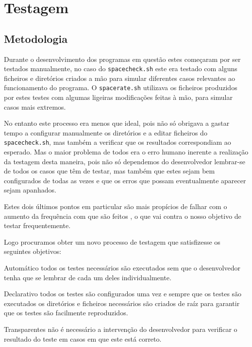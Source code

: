 \chapter{Testagem}

\section{Metodologia}\label{sec:testing_metodology}

Durante o desenvolvimento dos programas em questão estes começaram por ser
testados manualmente, no caso do \Verb|spacecheck.sh| este era testado com alguns
ficheiros e diretórios criados a mão para simular diferentes casos relevantes ao
funcionamento do programa. O \Verb|spacerate.sh| utilizava os ficheiros produzidos
por estes testes com algumas ligeiras modificações feitas à mão, para simular casos
mais extremos.

No entanto este processo era menos que ideal, pois não só obrigava a gastar
tempo a configurar manualmente os diretórios e a editar ficheiros do
\Verb|spacecheck.sh|, mas também a verificar que os
resultados correspondiam ao esperado. Mas o maior problema de todos era o erro
humano inerente a realização da testagem desta maneira, pois não só dependemos
do desenvolvedor lembrar-se de todos os casos que têm de testar, mas também que
estes sejam bem configurados de todas as vezes e que os erros que possam
eventualmente aparecer sejam apanhados.

Estes dois últimos pontos em particular são mais propícios de falhar com o
aumento da frequência com que são feitos \cite{fewster1999software, rafi2012benefits},
o que vai contra o nosso objetivo de testar frequentemente.

Logo procuramos obter um novo processo de testagem que satisfizesse os seguintes
objetivos:

\begin{enumdescript}
	\item[Automático]
	todos os testes necessários são executados sem que o desenvolvedor tenha que
	se lembrar de cada um deles individualmente.
	\item[Declarativo]
	todos os testes são configurados uma vez e sempre que os testes são
	executados os diretórios e ficheiros necessários são criados de raíz
	para garantir que os testes são facilmente reproduzidos.
	\item[Transparentes]
	não é necessário a intervenção do desenvolvedor para verificar o resultado
	do teste em casos em que este está correto.
\end{enumdescript}

